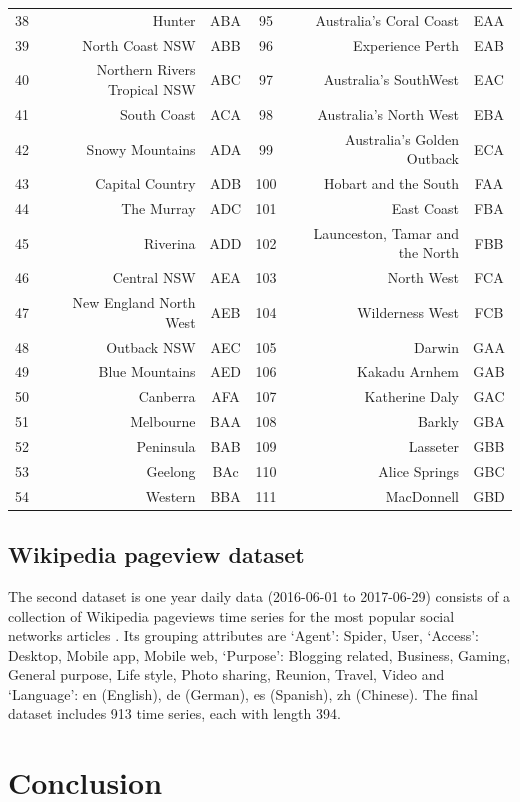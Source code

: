 \documentclass[11pt,a4paper,]{article}
\theoremstyle{definition}
\theoremstyle{definition}
\theoremstyle{definition}
\theoremstyle{remark}
\begin{document}
\begin{longtable}[]{@{}crccrc@{}}
38 & Hunter & ABA & 95 & Australia's Coral Coast & EAA\tabularnewline
39 & North Coast NSW & ABB & 96 & Experience Perth & EAB\tabularnewline
40 & Northern Rivers Tropical NSW & ABC & 97 & Australia's SouthWest &
EAC\tabularnewline
41 & South Coast & ACA & 98 & Australia's North West &
EBA\tabularnewline
42 & Snowy Mountains & ADA & 99 & Australia's Golden Outback &
ECA\tabularnewline
43 & Capital Country & ADB & 100 & Hobart and the South &
FAA\tabularnewline
44 & The Murray & ADC & 101 & East Coast & FBA\tabularnewline
45 & Riverina & ADD & 102 & Launceston, Tamar and the North &
FBB\tabularnewline
46 & Central NSW & AEA & 103 & North West & FCA\tabularnewline
47 & New England North West & AEB & 104 & Wilderness West &
FCB\tabularnewline
48 & Outback NSW & AEC & 105 & Darwin & GAA\tabularnewline
49 & Blue Mountains & AED & 106 & Kakadu Arnhem & GAB\tabularnewline
50 & Canberra & AFA & 107 & Katherine Daly & GAC\tabularnewline
51 & Melbourne & BAA & 108 & Barkly & GBA\tabularnewline
52 & Peninsula & BAB & 109 & Lasseter & GBB\tabularnewline
53 & Geelong & BAc & 110 & Alice Springs & GBC\tabularnewline
54 & Western & BBA & 111 & MacDonnell & GBD\tabularnewline
\bottomrule
\end{longtable}

\subsection{Wikipedia pageview
dataset}\label{wikipedia-pageview-dataset}

The second dataset is one year daily data (2016-06-01 to 2017-06-29)
consists of a collection of Wikipedia pageviews time series for the most
popular social networks articles \autocite[.]{Ashouri}. Its grouping
attributes are `Agent': Spider, User, `Access': Desktop, Mobile app,
Mobile web, `Purpose': Blogging related, Business, Gaming, General
purpose, Life style, Photo sharing, Reunion, Travel, Video and
`Language': en (English), de (German), es (Spanish), zh (Chinese). The
final dataset includes 913 time series, each with length 394.

\section{Conclusion}\label{conclusion}

\printbibliography[title=Discussion and further research]
\end{document}
